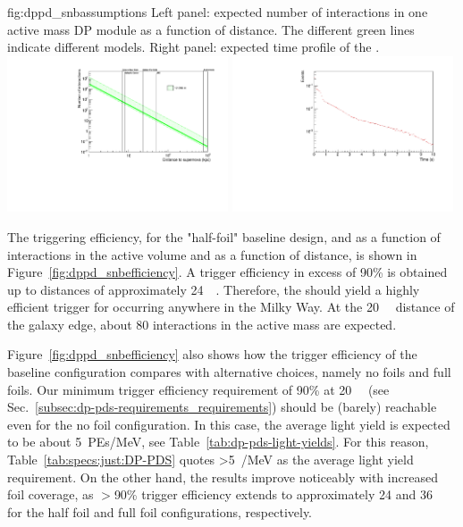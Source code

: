 \begin{dunefigure}{fig:dppd_snbassumptions}
     {Left panel: expected number of  \nue {} interactions in one \dpactivelarmass active mass DP module as a function of  distance. The different green lines indicate different  models. Right panel: expected time profile of the .}
    \includegraphics[width=0.49\textwidth]{graphics/dppd_events_vs_sndistance.pdf} \hfill
    \includegraphics[width=0.49\textwidth]{graphics/dppd_sntime_profile.pdf} 
    \end{dunefigure}

The  triggering efficiency, for the "half-foil" baseline  design, and as a function of  interactions in the active volume and as a function of  distance, is shown in Figure~\ref{fig:dppd_snbefficiency}. A trigger efficiency in excess of \num{90}\% is obtained up to  distances of approximately \SI{24}{\kilo\parsec}. Therefore, the  should yield a highly efficient trigger for  occurring anywhere in the Milky Way. At the \SI{20}{\kilo\parsec} distance of the galaxy  edge, about \num{80}  interactions in the \dpactivelarmass active mass are expected. 

Figure~\ref{fig:dppd_snbefficiency} also shows how the  trigger efficiency of the baseline configuration compares with alternative choices, namely no foils and full foils. Our minimum  trigger efficiency requirement of \num{90}\% at \SI{20}{\kilo\parsec} (see Sec.~\ref{subsec:dp-pds-requirements_requirements}) should be (barely) reachable even for the no foil configuration. In this case, the average light yield is expected to be about \SI{5}{PEs/MeV}, see Table~\ref{tab:dp-pds-light-yields}. For this reason, Table~\ref{tab:specs:just:DP-PDS} quotes \SI{>5}{/\MeV} as the average light yield requirement. On the other hand, the results improve noticeably with increased foil coverage, as $>$\num{90}\% trigger efficiency extends to approximately \num{24} and \SI{36}{\kilo\parsec} for the half foil and full foil configurations, respectively. 

